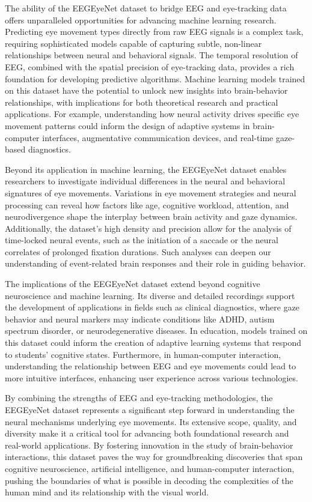 \documentclass{article}
\begin{document}
The ability of the EEGEyeNet dataset to bridge EEG and eye-tracking data offers unparalleled opportunities for advancing machine learning research. Predicting eye movement types directly from raw EEG signals is a complex task, requiring sophisticated models capable of capturing subtle, non-linear relationships between neural and behavioral signals. The temporal resolution of EEG, combined with the spatial precision of eye-tracking data, provides a rich foundation for developing predictive algorithms. Machine learning models trained on this dataset have the potential to unlock new insights into brain-behavior relationships, with implications for both theoretical research and practical applications. For example, understanding how neural activity drives specific eye movement patterns could inform the design of adaptive systems in brain-computer interfaces, augmentative communication devices, and real-time gaze-based diagnostics.

Beyond its application in machine learning, the EEGEyeNet dataset enables researchers to investigate individual differences in the neural and behavioral signatures of eye movements. Variations in eye movement strategies and neural processing can reveal how factors like age, cognitive workload, attention, and neurodivergence shape the interplay between brain activity and gaze dynamics. Additionally, the dataset’s high density and precision allow for the analysis of time-locked neural events, such as the initiation of a saccade or the neural correlates of prolonged fixation durations. Such analyses can deepen our understanding of event-related brain responses and their role in guiding behavior.

The implications of the EEGEyeNet dataset extend beyond cognitive neuroscience and machine learning. Its diverse and detailed recordings support the development of applications in fields such as clinical diagnostics, where gaze behavior and neural markers may indicate conditions like ADHD, autism spectrum disorder, or neurodegenerative diseases. In education, models trained on this dataset could inform the creation of adaptive learning systems that respond to students’ cognitive states. Furthermore, in human-computer interaction, understanding the relationship between EEG and eye movements could lead to more intuitive interfaces, enhancing user experience across various technologies.

By combining the strengths of EEG and eye-tracking methodologies, the EEGEyeNet dataset represents a significant step forward in understanding the neural mechanisms underlying eye movements. Its extensive scope, quality, and diversity make it a critical tool for advancing both foundational research and real-world applications. By fostering innovation in the study of brain-behavior interactions, this dataset paves the way for groundbreaking discoveries that span cognitive neuroscience, artificial intelligence, and human-computer interaction, pushing the boundaries of what is possible in decoding the complexities of the human mind and its relationship with the visual world.
\end{document}

